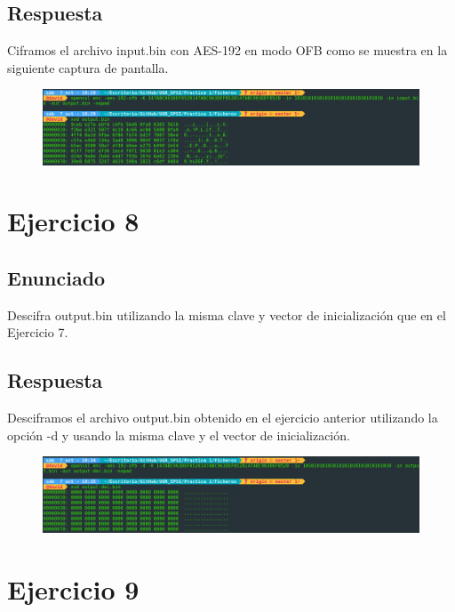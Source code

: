 \documentclass[10pt,a4paper,spanish]{report}
\begin{document}
\section{Respuesta}
\noindent
Ciframos el archivo input.bin con AES-192 en modo OFB como se muestra en la siguiente captura de pantalla.

\begin{figure}[!hbp]
 \centering  \includegraphics[width=1\textwidth]{./Imagenes/14.png}
\end{figure}


\chapter{Ejercicio 8}

\section{Enunciado}
\noindent
Descifra output.bin utilizando la misma clave y vector de inicialización que en el Ejercicio 7.

\section{Respuesta}
\noindent
Desciframos el archivo output.bin obtenido en el ejercicio anterior utilizando la opción -d y usando la misma clave y el vector de inicialización.

\begin{figure}[!hbp]
 \centering  \includegraphics[width=1\textwidth]{./Imagenes/15.png}
\end{figure}


\chapter{Ejercicio 9}
\end{document}
